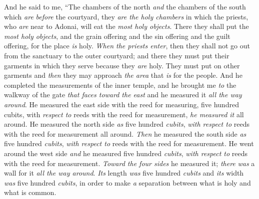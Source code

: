 \begin{biblechapter}
\verse And he said to me, “The chambers of the north \textit{and} the chambers of the south which \textit{are} \textit{before} the courtyard, they \textit{are the holy chambers} in which the priests, who \textit{are} near to Adonai, will eat the \textit{most holy objects}. There they shall put the \textit{most holy objects}, and the grain offering and the sin offering and the guilt offering, for the place \textit{is} holy.
\verse \textit{When the priests enter}, then they shall not go out from the sanctuary to the outer courtyard; and there they must put their garments in which they serve because they \textit{are} holy. They must put on other garments and \textit{then} they may approach \textit{the area} that \textit{is} for the people.
\verse And he completed the measurements of the inner temple, and he brought me \textit{to} the walkway of the gate \textit{that faces toward the east} and he measured it \textit{all the way around}.
\verse He measured the east side with the reed for measuring, five hundred cubits, with \textit{respect to} reeds with the reed for measurement, \textit{he measured it} all around.
\verse He measured the north side \textit{as} five hundred \textit{cubits}, \textit{with respect to} reeds with the reed for measurement all around.
\verse \textit{Then} he measured the south side \textit{as} five hundred \textit{cubits}, \textit{with respect to} reeds with the reed for measurement.
\verse He went around the west side \textit{and} he measured five hundred \textit{cubits}, \textit{with respect to} reeds with the reed for measurement.
\verse \textit{Toward the four sides} he measured it; \textit{there} \textit{was} a wall for it \textit{all the way around}. \textit{Its} length \textit{was} five hundred \textit{cubits} and \textit{its} width \textit{was} five hundred \textit{cubits}, in order to make \textit{a} separation between what is holy and what is common.
\end{biblechapter}

